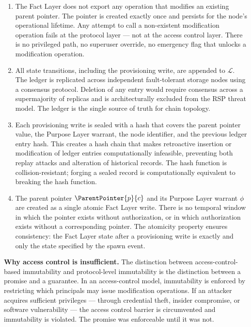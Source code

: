 \begin{enumerate}
    \item[(W1) \textbf{No modification operation.}] The Fact Layer does not export any operation that modifies an existing parent pointer. The pointer is created exactly once and persists for the node's operational lifetime. Any attempt to call a non-existent modification operation fails at the protocol layer — not at the access control layer. There is no privileged path, no superuser override, no emergency flag that unlocks a modification operation.

    \item[(W2) \textbf{Append-only ledger.}] All state transitions, including the provisioning write, are appended to $\mathcal{L}$. The ledger is replicated across independent fault-tolerant storage nodes using a consensus protocol. Deletion of any entry would require consensus across a supermajority of replicas and is architecturally excluded from the RSP threat model. The ledger is the single source of truth for chain topology.

    \item[(W3) \textbf{Cryptographic sealing.}] Each provisioning write is sealed with a hash that covers the parent pointer value, the Purpose Layer warrant, the node identifier, and the previous ledger entry hash. This creates a hash chain that makes retroactive insertion or modification of ledger entries computationally infeasible, preventing both replay attacks and alteration of historical records. The hash function is collision-resistant; forging a sealed record is computationally equivalent to breaking the hash function.

    \item[(W4) \textbf{Atomic provisioning.}] The parent pointer $\ParentPointer{p}{c}$ and its Purpose Layer warrant $\phi$ are created as a single atomic Fact Layer write. There is no temporal window in which the pointer exists without authorization, or in which authorization exists without a corresponding pointer. The atomicity property ensures consistency: the Fact Layer state after a provisioning write is exactly and only the state specified by the spawn event.
\end{enumerate}

\medskip
\noindent\textbf{Why access control is insufficient.} The distinction between access-control-based immutability and protocol-level immutability is the distinction between a promise and a guarantee. In an access-control model, immutability is enforced by restricting which principals may issue modification operations. If an attacker acquires sufficient privileges — through credential theft, insider compromise, or software vulnerability — the access control barrier is circumvented and immutability is violated. The promise was enforceable until it was not.

